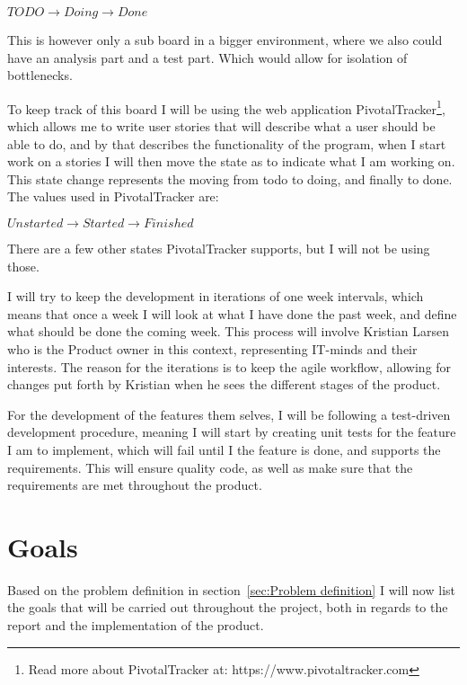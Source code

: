 \begin{center}
  $TODO \rightarrow Doing \rightarrow Done$
\end{center}

This is however only a sub board in a bigger environment, where we also could have an analysis part and a test part. Which would allow for isolation of bottlenecks\cite{kanban}.

To keep track of this board I will be using the web application PivotalTracker\footnote{Read more about PivotalTracker at: https://www.pivotaltracker.com}, which allows me to write user stories that will describe what a user should be able to do, and by that describes the functionality of the program, when I start work on a stories I will then move the state as to indicate what I am working on. This state change represents the moving from todo to doing, and finally to done. The values used in PivotalTracker are:

\begin{center}
  $Unstarted \rightarrow Started \rightarrow Finished$
\end{center}

There are a few other states PivotalTracker supports, but I will not be using those.

I will try to keep the development in iterations of one week intervals, which means that once a week I will look at what I have done the past week, and define what should be done the coming week. This process will involve Kristian Larsen who is the Product owner in this context, representing IT-minds and their interests. The reason for the iterations is to keep the agile workflow, allowing for changes put forth by Kristian when he sees the different stages of the product.

For the development of the features them selves, I will be following a test-driven development procedure, meaning I will start by creating unit tests for the feature I am to implement, which will fail until I the feature is done, and supports the requirements. This will ensure quality code, as well as make sure that the requirements are met throughout the product.

\section{Goals}
\label{sec:Goals}
Based on the problem definition in section~\ref{sec:Problem definition} I will now list the goals that will be carried out throughout the project, both in regards to the report and the implementation of the product.

